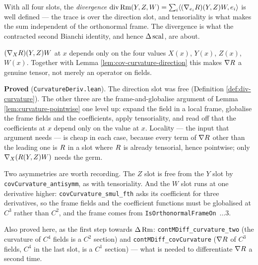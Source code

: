 \begin{lemma}
  With all four slots, the \emph{divergence}
  $\operatorname{div}\operatorname{Rm}(Y,Z,W) = \sum_i \langle (\nabla_{e_i}R)(Y,Z)W, e_i
  \rangle$ is well defined --- the trace is over the direction slot, and
  tensoriality is what makes the sum independent of the orthonormal frame. The
  divergence is what the contracted second Bianchi identity, and hence $\Delta
  \operatorname{scal}$, are about.
\end{lemma}

\begin{lemma}
  \label{lem:cov-curvature-pointwise}
  \leanok
  $(\nabla_XR)(Y,Z)W$ at $x$ depends only on the four values $X(x)$, $Y(x)$,
  $Z(x)$, $W(x)$. Together with Lemma \ref{lem:cov-curvature-direction} this
  makes $\nabla R$ a genuine tensor, not merely an operator on fields.

  \textbf{Proved} (\texttt{CurvatureDeriv.lean}). The direction slot was free
  (Definition \ref{def:div-curvature}). The other three are the
  frame-and-globalise argument of Lemma \ref{lem:curvature-pointwise} one level
  up: expand the field in a local frame, globalise the frame fields and the
  coefficients, apply tensoriality, and read off that the coefficients at $x$
  depend only on the value at $x$. Locality --- the input that argument needs
  --- is cheap in each case, because every term of $\nabla R$ other than the
  leading one is $R$ in a slot where $R$ is already tensorial, hence
  pointwise; only $\nabla_X(R(Y,Z)W)$ needs the germ.

  Two asymmetries are worth recording. The $Z$ slot is free from the $Y$ slot by
  \texttt{covCurvature\_antisymm}, as with tensoriality. And the $W$ slot runs
  at one derivative higher: \texttt{covCurvature\_smul\_fth} asks its
  coefficient for three derivatives, so the frame fields and the coefficient
  functions must be globalised at $C^3$ rather than $C^2$, and the frame comes
  from \texttt{IsOrthonormalFrameOn}\ $\ldots 3$.

  Also proved here, as the first step towards $\Delta\operatorname{Rm}$:
  \texttt{contMDiff\_curvature\_two} (the curvature of $C^4$ fields is a $C^2$
  section) and \texttt{contMDiff\_covCurvature} ($\nabla R$ of $C^3$ fields,
  $C^4$ in the last slot, is a $C^1$ section) --- what is needed to
  differentiate $\nabla R$ a second time.
\end{lemma}

